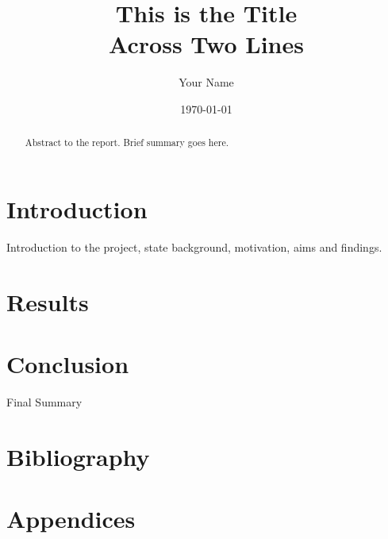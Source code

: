 \documentclass[11pt, A4]{article}
\title{This is the Title\\Across Two Lines}
\author{Your Name}
\date{\today}
\begin{document}
\begin{titlepage}
    \maketitle
    \thispagestyle{empty}
\end{titlepage}

\begin{abstract}
Abstract to the report. Brief summary goes here.
    
\end{abstract}

\newpage
\tableofcontents

\newpage
\section{Introduction}
Introduction to the project, state background, motivation, aims and findings.



\section{Results}

\section{Conclusion}
Final Summary

\newpage
\section{Bibliography}
\printbibliography

\newpage
\appendix 
\section{Appendices}
\end{document}
